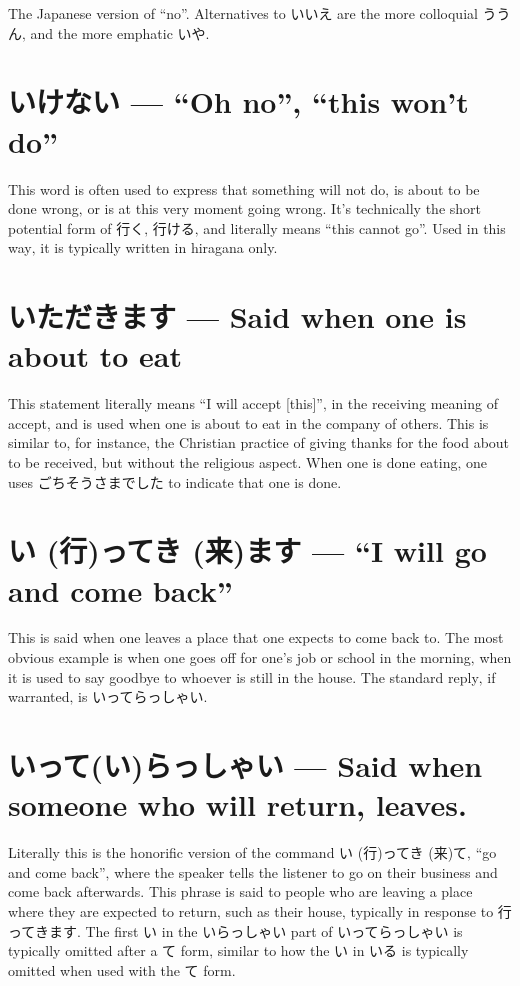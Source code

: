 \documentclass[11pt, b5paper, twoside, openright, onecolumn]{book}
\makeatletter
\newcommand*{\rubystack}[2]{{\relscale{0.5}%
  \begin{tabular}[b]{@{}c@{}}%
    {#1}\\%
   {\textscale{2}{#2}}%
  \end{tabular}}%
}
\DeclareRobustCommand*{\ruby}[2]{%
  \mbox{%
    \setlength{\parskip}{0ex}%
    \BeginAccSupp{method=pdfstringdef,ActualText={#1}}%
      \rubystack{\phantom{#2}}{#1}%
      \llap{%
        \rubystack{#2}{\phantom{#1}}%
      }%
    \EndAccSupp{}%
  }%
}
\renewcommand*{\ruby}[2]{#2 (#1)}%
\makeatother
\begin{document}
The Japanese version of “no”. Alternatives to いいえ are the more colloquial ううん‚ and the more emphatic いや.

\section*{いけない — “Oh no”‚ “this won’t do”}

This word is often used to express that something will not do‚ is about to be done wrong‚ or is at this very moment going wrong. It’s technically the short potential form of 行く‚ 行ける‚ and literally means “this cannot go”. Used in this way‚ it is typically written in hiragana only.

\section*{いただきます — Said when one is about to eat}

This statement literally means “I will accept [this]”‚ in the receiving meaning of accept‚ and is used when one is about to eat in the company of others. This is similar to‚ for instance‚ the Christian practice of giving thanks for the food about to be received‚ but without the religious aspect. When one is done eating‚ one uses ごちそうさまでした to indicate that one is done.

\section*{\ruby{行}{い}って\ruby{来}{き}ます — “I will go and come back”}

This is said when one leaves a place that one expects to come back to. The most obvious example is when one goes off for one’s job or school in the morning‚ when it is used to say goodbye to whoever is still in the house. The standard reply‚ if warranted‚ is いってらっしゃい.


\section*{いって(い)らっしゃい — Said when someone who will return‚ leaves.}

Literally this is the honorific version of the command \ruby{行}{い}って\ruby{来}{き}て‚ “go and come back”‚ where the speaker tells the listener to go on their business and come back afterwards. This phrase is said to people who are leaving a place where they are expected to return‚ such as their house‚ typically in response to 行ってきます. The first い in the いらっしゃい part of いってらっしゃい is typically omitted after a て form‚ similar to how the い in いる is typically omitted when used with the て form.
\end{document}
